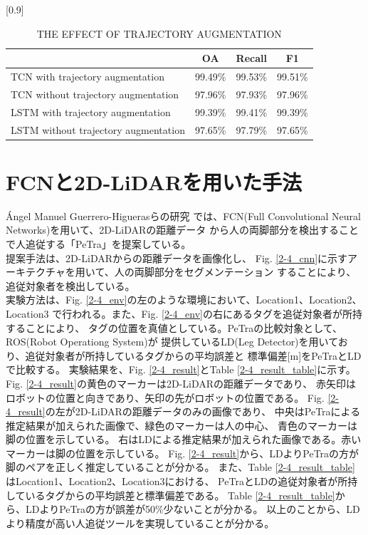 \begin{table}[b]
  \begin{center}
    \caption{{THE EFFECT OF TRAJECTORY AUGMENTATION\cite{Temporal convolutional networks for multi-person activity recognition using a 2D LIDAR}}
    \label{2-2_THE EFFECT OF TRAJECTORY AUGMENTATION}}
    \scalebox{1.0}[0.9]{
      \begin{tabular}{l|c|c|c} \hline
        & OA & Recall & F1 \\ \hline
        TCN with trajectory augmentation & 99.49\% & 99.53\% & 99.51\% \\ \hline
        TCN without trajectory augmentation & 97.96\% & 97.93\% & 97.96\% \\ \hline
        LSTM with trajectory augmentation & 99.39\% & 99.41\% & 99.39\% \\ \hline
        LSTM without trajectory augmentation & 97.65\% & 97.79\% & 97.65\% \\ \hline
      \end{tabular}
    }
  \end{center}
\end{table}

\clearpage

\section{FCNと2D-LiDARを用いた手法}
Ángel Manuel Guerrero-Higuerasらの研究
\cite{Tracking People in a Mobile Robot From 2D LIDAR Scans Using Full Convolutional Neural Networks for Security in Cluttered Environments}
では、FCN(Full Convolutional Neural Networks)を用いて、2D-LiDARの距離データ
から人の両脚部分を検出することで人追従する「PeTra」を提案している。\\ \indent
提案手法は、2D-LiDARからの距離データを画像化し、
Fig. \ref{2-4_cnn}に示すアーキテクチャを用いて、人の両脚部分をセグメンテーション
することにより、追従対象者を検出している。\\ \indent
実験方法は、Fig. \ref{2-4_env}の左のような環境において、Location1、Location2、Location3
で行われる。また、Fig. \ref{2-4_env}の右にあるタグを追従対象者が所持することにより、
タグの位置を真値としている。PeTraの比較対象として、ROS(Robot Operationg System)が
提供しているLD(Leg Detector)を用いており、追従対象者が所持しているタグからの平均誤差と
標準偏差[m]をPeTraとLDで比較する。
実験結果を、Fig. \ref{2-4_result}とTable \ref{2-4_result_table}に示す。
Fig. \ref{2-4_result}の黄色のマーカーは2D-LiDARの距離データであり、
赤矢印はロボットの位置と向きであり、矢印の先がロボットの位置である。
Fig. \ref{2-4_result}の左が2D-LiDARの距離データのみの画像であり、
中央はPeTraによる推定結果が加えられた画像で、緑色のマーカーは人の中心、
青色のマーカーは脚の位置を示している。
右はLDによる推定結果が加えられた画像である。赤いマーカーは脚の位置を示している。
Fig. \ref{2-4_result}から、LDよりPeTraの方が脚のペアを正しく推定していることが分かる。
また、Table \ref{2-4_result_table}はLocation1、Location2、Location3における、
PeTraとLDの追従対象者が所持しているタグからの平均誤差と標準偏差である。
Table \ref{2-4_result_table}から、LDよりPeTraの方が誤差が50\%少ないことが分かる。
以上のことから、LDより精度が高い人追従ツールを実現していることが分かる。

